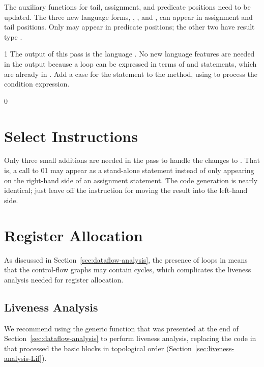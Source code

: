 \documentclass[7x10,nocrop]{TimesAPriori_MIT}%
\def\racketEd{0}
\def\pythonEd{1}
\def\edition{1}
\newcommand{\racket}[1]{{\if\edition\racketEd{#1}\fi}}
\newcommand{\python}[1]{{\if\edition\pythonEd #1\fi}}
\begin{document}
{The auxiliary functions for tail, assignment, and predicate positions
need to be updated. The three new language forms, ,
, and , can appear in assignment and tail
positions.  Only  may appear in predicate positions; the
other two have result type .

\fi}
%
{\if\edition\pythonEd
%
The output of this pass is the language \LangCIf{}. No new language
features are needed in the output because a  loop can be
expressed in terms of  and  statements, which are
already in \LangCIf{}.
%  
Add a case for the  statement to the
 method, using  to process
the condition expression.
%
\fi}

{\if\edition\racketEd
  
\section{Select Instructions}
\label{sec:select-instructions-loop}

Only three small additions are needed in the
 pass to handle the changes to
\LangCLoop{}.  That is, a call to
\racket{}\python{} may appear as a
stand-alone statement instead of only appearing on the right-hand side
of an assignment statement. The code generation is nearly identical;
just leave off the instruction for moving the result into the
left-hand side.

\fi}

\section{Register Allocation}
\label{sec:register-allocation-loop}

As discussed in Section~\ref{sec:dataflow-analysis}, the presence of
loops in \LangLoop{} means that the control-flow graphs may contain cycles,
which complicates the liveness analysis needed for register
allocation.

\subsection{Liveness Analysis}
\label{sec:liveness-analysis-r8}

We recommend using the generic  function that
was presented at the end of Section~\ref{sec:dataflow-analysis} to
perform liveness analysis, replacing the code in
 that processed the basic blocks in topological
order (Section~\ref{sec:liveness-analysis-Lif}).
\end{document}

